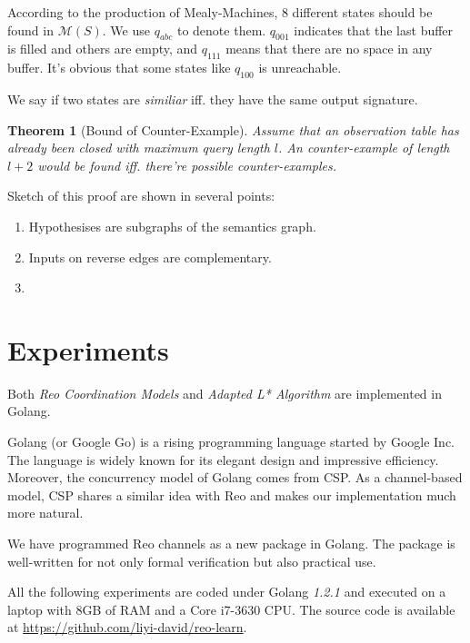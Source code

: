 \documentclass[conference, a4paper]{IEEEtran}
\newtheorem{theorem}{Theorem}
\begin{document}
According to the production of Mealy-Machines, 8 different states should be found in
$\mathcal{M}(S)$. We use $q_{abc}$ to denote them. $q_{001}$ indicates that the last buffer is
filled and others are empty, and $q_{111}$ means that there are no space in any buffer. It's
obvious that some states like $q_{100}$ is unreachable.

We say if two states are \emph{similiar} iff. they have the same output signature.

\begin{theorem}[Bound of Counter-Example]
  \label{the:cebound} Assume that an observation table has already been closed with maximum
  query length  $l$. An counter-example of length $l+2$ would be
  found iff. there're possible counter-examples.
\end{theorem}
\begin{IEEEproof}
  Sketch of this proof are shown in several points:
  \begin{enumerate}
    \item Hypothesises are subgraphs of the semantics graph.
    \item Inputs on reverse edges are complementary.
    \item 
  \end{enumerate}
\end{IEEEproof}

\section{Experiments} 
\label{sec:experiment}

Both \emph{Reo Coordination Models} and \emph{Adapted L* Algorithm} are implemented in
Golang\cite{golang}.

Golang (or Google Go) is a rising programming language started by Google Inc. The language is widely
known for its elegant design and impressive efficiency. Moreover, the concurrency model of Golang
comes from CSP\cite{DBLP:books/ph/Hoare85}. As a channel-based model, CSP shares a similar idea with
Reo and makes our implementation much more natural.

We have programmed Reo channels as a new package in Golang. The package is well-written for not only
formal verification but also practical use.

All the following experiments are coded under Golang \emph{1.2.1} and executed on a laptop with 8GB
of RAM and a Core i7-3630 CPU. The source code is available at
\url{https://github.com/liyi-david/reo-learn}.
\end{document}
